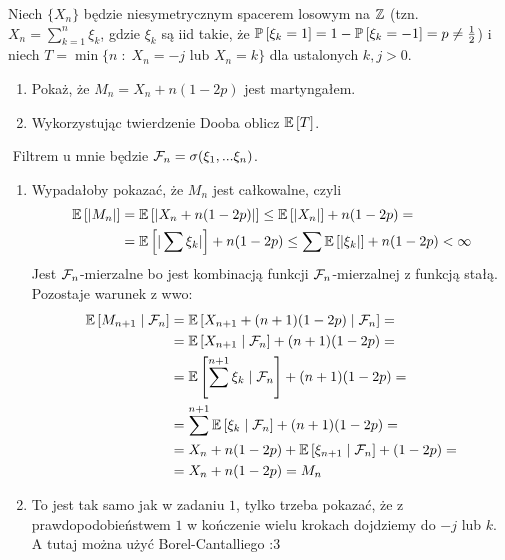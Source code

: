 \begin{problem}
  Niech $\{X_n\}$ będzie niesymetrycznym spacerem losowym na $\operatorname{\mathbb{Z}}$ (tzn. $X_n=\sum_{k=1}^n\xi_k$, gdzie $\xi_k$ są iid takie, że $\prob{\xi_k=1}=1-\prob{\xi_k=-1}=p\neq\frac{1}{2}$) i niech $T=\min\{n\;:\;X_n=-j\text{ lub }X_n=k\}$ dla ustalonych $k,j>0$.
  \begin{enumerate}[label=(\alph*)]
    \item Pokaż, że $M_n=X_n+n(1-2p)$ jest martyngałem.
    \item Wykorzystując twierdzenie Dooba oblicz $\expected{T}$.
  \end{enumerate}
\end{problem}

\begin{solution}$ $
  Filtrem u mnie będzie $\mathcal{F}_n=\sigma(\xi_1,...\xi_n)$.

  \begin{enumerate}[label=(\alph*)]
    \item Wypadałoby pokazać, że $M_n$ jest całkowalne, czyli
      \begin{align*}
        \expected{|M_n|}&=\expected{|X_n+n(1-2p)|}\leq \expected{|X_n|}+n(1-2p)=\\ 
                        &=\expected{|\sum\xi_k|}+n(1-2p)\leq \sum\expected{|\xi_k|}+n(1-2p)<\infty 
      \end{align*}
      Jest $\mathcal{F}_n$-mierzalne bo jest kombinacją funkcji $\mathcal{F}_n$-mierzalnej z funkcją stałą. Pozostaje warunek z wwo:
      \begin{align*}
        \expected{M_{n+1}}{\set{F}_n}&=\expected{X_{n+1}+(n+1)(1-2p)}{\set{F}_n}=\\ 
                                     &=\expected{X_{n+1}}{\set{F}_n}+(n+1)(1-2p)=\\ 
                                     &=\expected{\sum^{n+1}\xi_k}{\set{F}_n}+(n+1)(1-2p)=\\ 
                                     &=\sum^{n+1}\expected{\xi_k}{\set{F}_n}+(n+1)(1-2p)=\\ 
                                     &=X_n+n(1-2p)+\expected{\xi_{n+1}}{\set{F}_n}+(1-2p)=\\ 
                                     &=X_n+n(1-2p)=M_n
      \end{align*}
    \item To jest tak samo jak w zadaniu $1$, tylko trzeba pokazać, że z prawdopodobieństwem $1$ w kończenie wielu krokach dojdziemy do $-j$ lub $k$. A tutaj można użyć Borel-Cantalliego :3
  \end{enumerate}
\end{solution}

